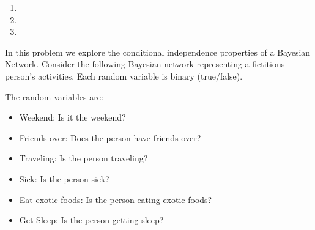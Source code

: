 \documentclass[submit]{harvardml}
\newcommand{\attr}[1]{\textsf{#1}}
\begin{document}
\begin{enumerate}
  \item 
  \item 
  \item 
\end{enumerate}

\newpage

\begin{problem}

% 
% 

  
  \noindent In this problem we explore the conditional independence
  properties of a Bayesian Network.  Consider the following Bayesian
  network representing a fictitious person's activities. Each random
  variable is binary (true/false).

\begin{center}
\end{center}

The random variables are:

\begin{itemize}
\item \attr{Weekend}: Is it the weekend?
\item \attr{Friends over}: Does the person have friends over?
\item \attr{Traveling}: Is the person traveling?
\item \attr{Sick}: Is the person sick?
\item \attr{Eat exotic foods}: Is the person eating exotic foods?
\item \attr{Get Sleep}: Is the person getting sleep?
\end{itemize}


\end{problem}
\end{document}
